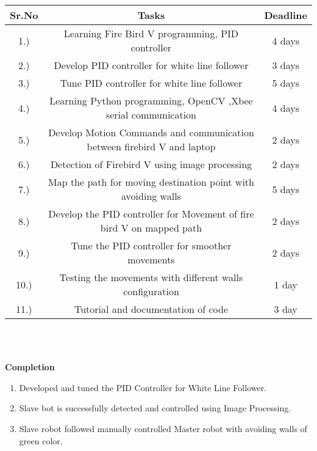 \documentclass[report]{res}
\begin{document}
	
	\begin{tabular}{ | c | c | c |}
		\hline
		\bf Sr.No & \bf Tasks & \bf Deadline \\ 
		\hline
		1.) & Learning Fire Bird V programming, PID controller & 4 days \\
		\hline
		2.) & Develop PID controller for white line follower & 3 days \\
		\hline
		3.) & Tune PID controller for white line follower & 5 days \\
		\hline
		4.) & Learning Python programming, OpenCV ,Xbee serial communication& 4 days \\
		\hline
		5.) & Develop Motion Commands and communication between firebird V and laptop & 2 days \\ 
		\hline
		6.) & Detection of Firebird V using image processing & 2 days \\ 
		\hline
		7.) & Map the path for moving destination point with avoiding walls & 5 days \\ 
		\hline
		8.) & Develop the PID controller for Movement of fire bird V on mapped path & 2 days\\ 
		\hline
		9.) & Tune the PID controller for smoother movements & 2 days \\ 
		\hline
		10.) & Testing the movements with different walls configuration & 1 day \\ 
		\hline
		11.) & Tutorial and documentation of code & 3 day \\ 
		\hline
		
	\end{tabular} \\ \\
	
	\pagebreak	
	
	
	\begin{center}
			{\huge \textbf{Completion}\par}
	\end{center}
	
	\begin{enumerate}
	 \item Developed and tuned the PID Controller for White Line Follower. \\
	 \item Slave bot is successfully detected and controlled using Image Processing. \\
	 \item Slave robot followed manually controlled Master robot with avoiding walls of green color. \\
	\end{enumerate}
	
\end{document}

